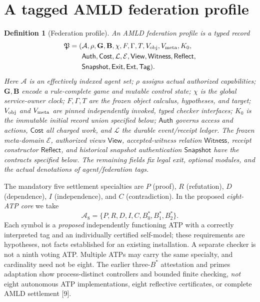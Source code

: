 \documentclass[10pt,letterpaper]{article}
\newtheorem{definition}{Definition}[section]
\theoremstyle{remark}\newtheorem{remark}[definition]{Remark}
\newcommand{\Ag}{\mathcal{A}}
\begin{document}
\section{A tagged AMLD federation profile}
\begin{definition}[Federation profile]
An AMLD federation profile is a typed record
\[
\begin{aligned}
\mathfrak P=(&\Ag,\rho,\mathbf G,\mathbf B,\chi,F,\Gamma,T,V_{\rm obj},V_{\rm meta},K_0,\\
&\mathsf{Auth},\mathsf{Cost},\mathcal L,\mathcal E,\mathsf{View},\mathsf{Witness},\mathsf{Reflect},\\
&\mathsf{Snapshot},\mathsf{Exit},\mathsf{Ext},\mathsf{Tag}).
\end{aligned}
\]
Here $\Ag$ is an effectively indexed agent set; $\rho$ assigns actual authorized capabilities; $\mathbf G,\mathbf B$ encode a rule-complete game and mutable control state; $\chi$ is the global service-owner clock; $F,\Gamma,T$ are the frozen object calculus, hypotheses, and target; $V_{\rm obj}$ and $V_{\rm meta}$ are pinned independently invoked, \emph{typed} checker interfaces; $K_0$ is the immutable initial record union specified below; $\mathsf{Auth}$ governs access and actions, $\mathsf{Cost}$ all charged work, and $\mathcal L$ the durable event/receipt ledger. The frozen meta-domain $\mathcal E$, authorized views $\mathsf{View}$, accepted-witness relation $\mathsf{Witness}$, receipt constructor $\mathsf{Reflect}$, and historical snapshot authentication $\mathsf{Snapshot}$ have the contracts specified below. The remaining fields fix legal exit, optional modules, and the actual denotations of agent/federation tags.
\end{definition}

The mandatory five settlement specialties are $P$ (proof), $R$ (refutation), $D$ (dependence), $I$ (independence), and $C$ (contradiction). In the proposed \emph{eight-ATP core} we take
\[
\Ag_8=\{P,R,D,I,C,B^*_0,B^*_1,B^*_2\}.
\]
Each symbol is a \emph{proposed} independently functioning ATP with a correctly interpreted tag and an individually certified self-model; these requirements are hypotheses, not facts established for an existing installation. A separate checker is not a ninth voting ATP. Multiple ATPs may carry the same specialty, and cardinality need not be eight. The earlier three-$B^*$ attestation and primes adaptation show process-distinct controllers and bounded finite checking, \emph{not} eight autonomous ATP implementations, eight reflective certificates, or complete AMLD settlement [9].
\end{document}
